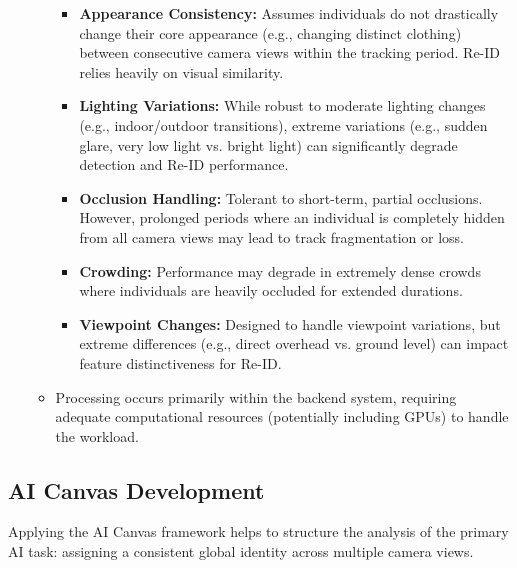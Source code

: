 \begin{itemize}
\begin{itemize}
                \begin{itemize}
                    \item \textbf{Appearance Consistency:} Assumes individuals do not drastically change their core appearance (e.g., changing distinct clothing) between consecutive camera views within the tracking period. Re-ID relies heavily on visual similarity.
                    \item \textbf{Lighting Variations:} While robust to moderate lighting changes (e.g., indoor/outdoor transitions), extreme variations (e.g., sudden glare, very low light vs. bright light) can significantly degrade detection and Re-ID performance.
                    \item \textbf{Occlusion Handling:} Tolerant to short-term, partial occlusions. However, prolonged periods where an individual is completely hidden from all camera views may lead to track fragmentation or loss.
                    \item \textbf{Crowding:} Performance may degrade in extremely dense crowds where individuals are heavily occluded for extended durations.
                    \item \textbf{Viewpoint Changes:} Designed to handle viewpoint variations, but extreme differences (e.g., direct overhead vs. ground level) can impact feature distinctiveness for Re-ID.
                \end{itemize}
            \item Processing occurs primarily within the backend system, requiring adequate computational resources (potentially including GPUs) to handle the workload.
        \end{itemize}
\end{itemize}


\subsection{AI Canvas Development}
\label{subsection:ai-canvas-development}
Applying the AI Canvas framework helps to structure the analysis of the primary AI task: assigning a consistent global identity across multiple camera views.

